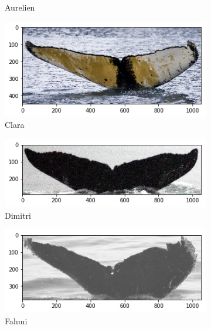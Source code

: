 \begin{frame}[c]
\begin{figure}
\begin{subfigure}[b]{0.24\linewidth}
            \caption{Aurelien}
        \end{subfigure}
        \begin{subfigure}[b]{0.24\linewidth}
            \centering
            \includegraphics[width=\linewidth]{Whales/new_whale3.png}
            \caption{Clara}
        \end{subfigure}
        \begin{subfigure}[b]{0.24\linewidth}
            \centering
            \includegraphics[width=\linewidth]{Whales/w_5101888.png}
            \caption{Dimitri}
        \end{subfigure}
        \begin{subfigure}[b]{0.24\linewidth}
            \centering
            \includegraphics[width=\linewidth]{Whales/w_865cf80.png}
            \caption{Fahmi}
        \end{subfigure}
        \begin{subfigure}[b]{0.24\linewidth}

\end{subfigure}
\end{figure}
\end{frame}
